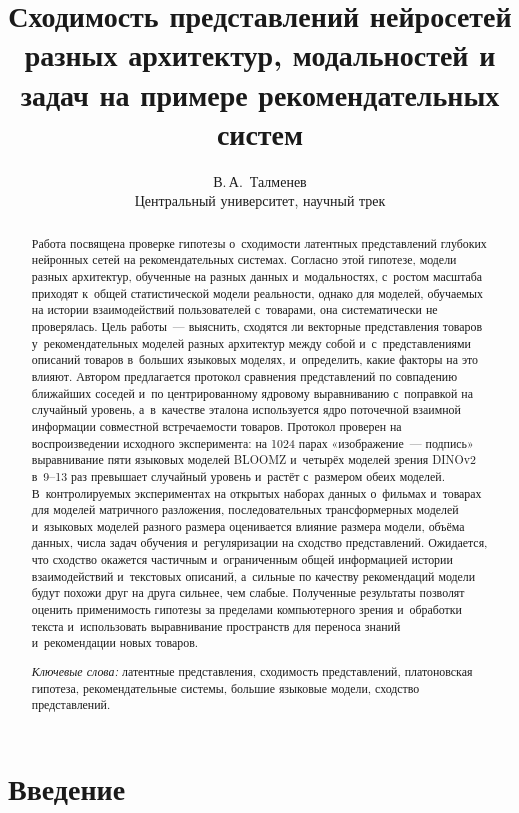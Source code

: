 \documentclass[a4paper,12pt]{article}
\title{Сходимость представлений нейросетей разных архитектур, модальностей
  и задач на примере рекомендательных систем}
\author{В.\,А.~Талменев\\[2pt] \small Центральный университет, научный трек}
\date{}
\begin{document}
\maketitle

\begin{abstract}
Работа посвящена проверке гипотезы о~сходимости латентных представлений
глубоких нейронных сетей на рекомендательных системах. Согласно этой гипотезе,
модели разных архитектур, обученные на разных данных и~модальностях, с~ростом
масштаба приходят к~общей статистической модели реальности, однако для моделей,
обучаемых на истории взаимодействий пользователей с~товарами, она систематически
не проверялась. Цель работы~--- выяснить, сходятся ли векторные представления
товаров у~рекомендательных моделей разных архитектур между собой и~с~представлениями
описаний товаров в~больших языковых моделях, и~определить, какие факторы на это
влияют. Автором предлагается протокол сравнения представлений по совпадению
ближайших соседей и~по центрированному ядровому выравниванию с~поправкой
на случайный уровень, а~в~качестве эталона используется ядро поточечной взаимной
информации совместной встречаемости товаров. Протокол проверен на воспроизведении
исходного эксперимента: на 1024 парах «изображение~--- подпись» выравнивание пяти
языковых моделей BLOOMZ и~четырёх моделей зрения DINOv2 в~9--13 раз превышает
случайный уровень и~растёт с~размером обеих моделей. В~контролируемых экспериментах
на открытых наборах данных о~фильмах и~товарах для моделей матричного разложения,
последовательных трансформерных моделей и~языковых моделей разного размера
оценивается влияние размера модели, объёма данных, числа задач обучения
и~регуляризации на сходство представлений. Ожидается, что сходство окажется
частичным и~ограниченным общей информацией истории взаимодействий и~текстовых
описаний, а~сильные по качеству рекомендаций модели будут похожи друг на друга
сильнее, чем слабые. Полученные результаты позволят оценить применимость гипотезы
за пределами компьютерного зрения и~обработки текста и~использовать выравнивание
пространств для переноса знаний и~рекомендации новых товаров.

\medskip
\noindent\textit{Ключевые слова:} латентные представления, сходимость представлений,
платоновская гипотеза, рекомендательные системы, большие языковые модели,
сходство представлений.
\end{abstract}

\section{Введение}
\end{document}
